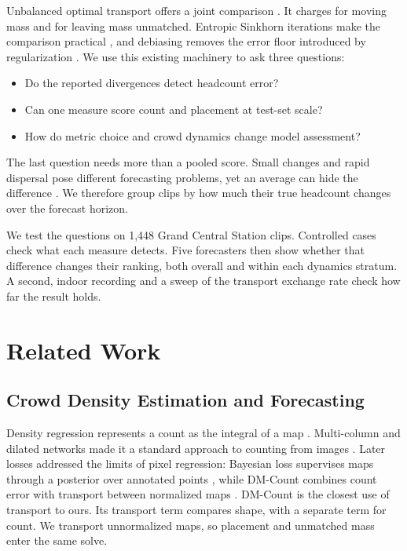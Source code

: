 \documentclass{article}
\begin{document}
Unbalanced optimal transport offers a joint comparison \cite{chizat2018}. It charges for moving mass and for leaving mass unmatched. Entropic Sinkhorn iterations make the comparison practical \cite{cuturi2013}, and debiasing removes the error floor introduced by regularization \cite{feydy2019}. We use this existing machinery to ask three questions:

\begin{itemize}
    \item[\textbf{RQ1}] Do the reported divergences detect headcount error?
    \item[\textbf{RQ2}] Can one measure score count and placement at test-set scale?
    \item[\textbf{RQ3}] How do metric choice and crowd dynamics change model assessment?
\end{itemize}

The last question needs more than a pooled score. Small changes and rapid dispersal pose different forecasting problems, yet an average can hide the difference \cite{oakden2020, wang2026}. We therefore group clips by how much their true headcount changes over the forecast horizon.

We test the questions on 1{,}448 Grand Central Station clips. Controlled cases check what each measure detects. Five forecasters then show whether that difference changes their ranking, both overall and within each dynamics stratum. A second, indoor recording and a sweep of the transport exchange rate check how far the result holds.

\section{Related Work}
\label{sec:related-work}

\subsection{Crowd Density Estimation and Forecasting}
\label{sec:related-density}

Density regression represents a count as the integral of a map \cite{lempitsky2010}. Multi-column and dilated networks made it a standard approach to counting from images \cite{zhang2016, li2018}. Later losses addressed the limits of pixel regression: Bayesian loss supervises maps through a posterior over annotated points \cite{ma2019}, while DM-Count combines count error with transport between normalized maps \cite{wang2020}. DM-Count is the closest use of transport to ours. Its transport term compares shape, with a separate term for count. We transport unnormalized maps, so placement and unmatched mass enter the same solve.
\end{document}
